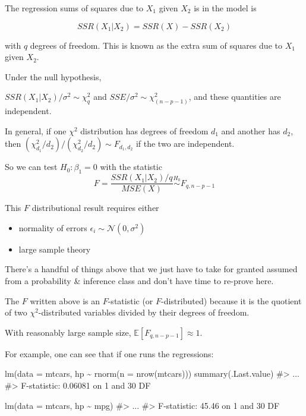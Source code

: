 \documentclass[
  letterpaper,
  DIV=11,
  numbers=noendperiod]{scrreport}
\newenvironment{Shaded}{\begin{snugshade}}{\end{snugshade}}
\newcommand{\AttributeTok}[1]{\textcolor[rgb]{0.40,0.45,0.13}{#1}}
\newcommand{\CommentTok}[1]{\textcolor[rgb]{0.37,0.37,0.37}{#1}}
\newcommand{\FunctionTok}[1]{\textcolor[rgb]{0.28,0.35,0.67}{#1}}
\newcommand{\NormalTok}[1]{\textcolor[rgb]{0.00,0.23,0.31}{#1}}
\newcommand{\SpecialCharTok}[1]{\textcolor[rgb]{0.37,0.37,0.37}{#1}}
\providecommand{\tightlist}{%
  \setlength{\itemsep}{0pt}\setlength{\parskip}{0pt}}\usepackage{longtable,booktabs,array}
\begin{document}
The regression sums of squares due to \(X_1\) given \(X_2\) is in the
model is

\[SSR(X_1|X_2) = SSR(X) - SSR(X_2)\]

with \(q\) degrees of freedom. This is known as the {extra sum of
squares due to \(X_1\) given \(X_2\)}.

Under the null hypothesis,

\(SSR(X_1|X_2)/\sigma^2 \sim \chi_q^2\) and
\(SSE/\sigma^2 \sim \chi_{(n-p-1)}^2\), and these quantities are
independent.

In general, if one \(\chi^2\) distribution has degrees of freedom
\(d_1\) and another has \(d_2\), then
\((\chi_{d_1}^2/d_2)/(\chi_{d_2}^2/d_2) \sim F_{d_1,d_2}\) if the two
are independent.

So we can test \(H_0: \beta_1 = 0\) with the statistic
\[F = \frac{SSR(X_1|X_2)/q}{MSE(X)} \stackrel{H_0}{\sim} F_{q,n-p-1}\]

This \(F\) distributional result requires either

\begin{itemize}
\tightlist
\item
  normality of errors \(\epsilon_i \sim \mathcal N(0,\sigma^2)\)
\item
  large sample theory
\end{itemize}

There's a handful of things above that we just have to take for granted
assumed from a probability \& inference class and don't have time to
re-prove here.

The \(F\) written above is an \(F\)-statistic (or \(F\)-distributed)
because it is the quotient of two \(\chi^2\)-distributed variables
divided by their degrees of freedom.

With reasonably large sample size, \(\mathbb E[F_{q,n-p-1}] \approx 1\).

For example, one can see that if one runs the regressions:

\begin{Shaded}
\begin{Highlighting}[]
\FunctionTok{lm}\NormalTok{(}\AttributeTok{data =}\NormalTok{ mtcars, hp }\SpecialCharTok{\textasciitilde{}} \FunctionTok{rnorm}\NormalTok{(}\AttributeTok{n =} \FunctionTok{nrow}\NormalTok{(mtcars)))}
\FunctionTok{summary}\NormalTok{(.Last.value)}
\CommentTok{\#\textgreater{} ... }
\CommentTok{\#\textgreater{} F{-}statistic: 0.06081 on 1 and 30 DF}

\FunctionTok{lm}\NormalTok{(}\AttributeTok{data =}\NormalTok{ mtcars, hp }\SpecialCharTok{\textasciitilde{}}\NormalTok{ mpg)}
\CommentTok{\#\textgreater{} ... }
\CommentTok{\#\textgreater{} F{-}statistic: 45.46 on 1 and 30 DF}
\end{Highlighting}
\end{Shaded}
\end{document}
